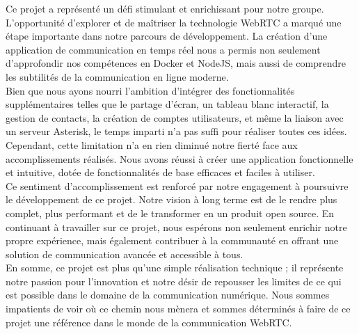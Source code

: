 \documentclass[12pt, a4paper, oneside]{Thesis}
\begin{document}
Ce projet a représenté un défi stimulant et enrichissant pour notre groupe. L'opportunité d'explorer et de maîtriser la technologie WebRTC a marqué une étape importante dans notre parcours de développement. La création d'une application de communication en temps réel nous a permis non seulement d'approfondir nos compétences en Docker et NodeJS, mais aussi de comprendre les subtilités de la communication en ligne moderne.\\

Bien que nous ayons nourri l'ambition d'intégrer des fonctionnalités supplémentaires telles que le partage d'écran, un tableau blanc interactif, la gestion de contacts, la création de comptes utilisateurs, et même la liaison avec un serveur Asterisk, le temps imparti n'a pas suffi pour réaliser toutes ces idées. Cependant, cette limitation n'a en rien diminué notre fierté face aux accomplissements réalisés. Nous avons réussi à créer une application fonctionnelle et intuitive, dotée de fonctionnalités de base efficaces et faciles à utiliser.\\

Ce sentiment d'accomplissement est renforcé par notre engagement à poursuivre le développement de ce projet. Notre vision à long terme est de le rendre plus complet, plus performant et de le transformer en un produit open source. En continuant à travailler sur ce projet, nous espérons non seulement enrichir notre propre expérience, mais également contribuer à la communauté en offrant une solution de communication avancée et accessible à tous.\\

En somme, ce projet est plus qu'une simple réalisation technique ; il représente notre passion pour l'innovation et notre désir de repousser les limites de ce qui est possible dans le domaine de la communication numérique. Nous sommes impatients de voir où ce chemin nous mènera et sommes déterminés à faire de ce projet une référence dans le monde de la communication WebRTC.\\
\end{document}
